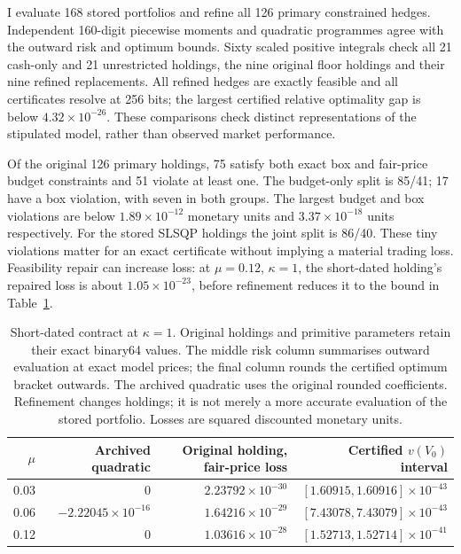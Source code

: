 \documentclass[11pt]{article}
\begin{document}
I evaluate 168 stored portfolios and refine all 126 primary constrained
hedges. Independent 160-digit piecewise moments and quadratic programmes
agree with the outward risk and optimum bounds. Sixty scaled positive
integrals check all 21 cash-only and 21 unrestricted holdings, the nine
original floor holdings and their nine refined replacements. All refined
hedges are exactly feasible and all certificates resolve at 256 bits;
the largest certified relative optimality gap is below
$4.32\times10^{-26}$. These comparisons check distinct representations
of the stipulated model, rather than observed market performance.

Of the original 126 primary holdings, 75 satisfy both exact box and
fair-price budget constraints and 51 violate at least one. The budget-only
split is 85/41; 17 have a box violation, with seven in both groups.
The largest budget and box violations are below $1.89\times10^{-12}$
monetary units and $3.37\times10^{-18}$ units respectively. For the stored
SLSQP holdings the joint split is 86/40. These tiny violations matter for
an exact certificate without implying a material trading loss. Feasibility
repair can increase loss: at $\mu=0.12$, $\kappa=1$, the short-dated
holding's repaired loss is about $1.05\times10^{-23}$, before refinement
reduces it to the bound in Table~\ref{tab:h-validated-tail}.

\begin{table}[tb]
\centering\small
\begin{tabular}{rrrr}
\toprule
$\mu$ & Archived quadratic & Original holding, fair-price loss
 & Certified $v(V_0)$ interval \\
\midrule
0.03 & $0$ & $2.23792\times10^{-30}$ & $[1.60915,1.60916]\times10^{-43}$ \\
0.06 & $-2.22045\times10^{-16}$ & $1.64216\times10^{-29}$ & $[7.43078,7.43079]\times10^{-43}$ \\
0.12 & $0$ & $1.03616\times10^{-28}$ & $[1.52713,1.52714]\times10^{-41}$ \\
\bottomrule
\end{tabular}
\caption{Short-dated contract at $\kappa=1$. Original holdings and primitive
parameters retain their exact binary64 values. The middle risk column
summarises outward evaluation at exact model prices; the final column
rounds the certified optimum bracket outwards. The archived quadratic
uses the original rounded coefficients. Refinement changes holdings;
it is not merely a more accurate evaluation of the stored portfolio.
Losses are squared discounted monetary units.}
\label{tab:h-validated-tail}
\end{table}
\end{document}

